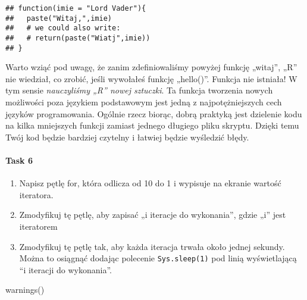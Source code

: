 \documentclass[
]{article}
\providecommand{\tightlist}{%
  \setlength{\itemsep}{0pt}\setlength{\parskip}{0pt}}
\begin{document}
\begin{verbatim}
## function(imie = "Lord Vader"){
##   paste("Witaj,",imie)
##   # we could also write:
##   # return(paste("Wiatj",imie))
## }
\end{verbatim}

Warto wziąć pod uwagę, że zanim zdefiniowaliśmy powyżej funkcję
„witaj'', „R'' nie wiedział, co zrobić, jeśli wywołałeś funkcję
„hello()''. Funkcja nie istniała! W tym sensie \emph{nauczyliśmy „R''
nowej sztuczki}. Ta funkcja tworzenia nowych możliwości poza językiem
podstawowym jest jedną z najpotężniejszych cech języków programowania.
Ogólnie rzecz biorąc, dobrą praktyką jest dzielenie kodu na kilka
mniejszych funkcji zamiast jednego długiego pliku skryptu. Dzięki temu
Twój kod będzie bardziej czytelny i łatwiej będzie wyśledzić błędy.

\hypertarget{task-6}{%
\paragraph{Task 6}\label{task-6}}

\begin{enumerate}
\def\labelenumi{\arabic{enumi}.}
\tightlist
\item
  Napisz pętlę for, która odlicza od 10 do 1 i wypisuje na ekranie
  wartość iteratora.
\item
  Zmodyfikuj tę pętlę, aby zapisać „i iteracje do wykonania'', gdzie
  „i'' jest iteratorem
\item
  Zmodyfikuj tę pętlę tak, aby każda iteracja trwała około jednej
  sekundy. Można to osiągnąć dodając polecenie \texttt{Sys.sleep(1)} pod
  linią wyświetlającą ``i iteracji do wykonania''.
\end{enumerate}

warnings()
\end{document}
